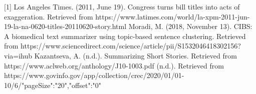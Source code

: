 \documentclass[11pt,a4paper]{article}
\begin{document}
[1] Los Angeles Times. (2011, June 19). Congress turns bill titles into acts of exaggeration. Retrieved from https://www.latimes.com/world/la-xpm-2011-jun-19-la-na-0620-titles-20110620-story.html 
\newline
\newline
[2] Moradi, M. (2018, November 13). CIBS: A biomedical text summarizer using topic-based sentence clustering. Retrieved from https://www.sciencedirect.com/science/article/pii/S1532046418302156?via=ihub 
\newline
\newline
[3] Kazantseva, A. (n.d.). Summarizing Short Stories. Retrieved from https://www.aclweb.org/anthology/J10-1003.pdf 
\newline
\newline
[4](n.d.). Retrieved from https://www.govinfo.gov/app/collection/crec/2020/01/01-10/6/{"pageSize":"20","offset":"0"} 
\end{document}

